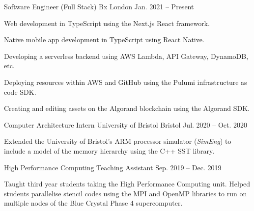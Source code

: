 \vspace{-1.1em}


\vspace{-0.2em}

\begin{cventries}

  \cventry
    {Software Engineer (Full Stack)} %
    {Bx} %
    {London} %
    {Jan. 2021 -- Present} %
    {
      \begin{cvitems} %
        \item {Web development in TypeScript using the Next.js React framework.}
        \item {Native mobile app development in TypeScript using React Native.}
        \item {Developing a serverless backend using AWS Lambda, API Gateway, DynamoDB, etc.}
        \item {Deploying resources within AWS and GitHub using the Pulumi infrastructure as code SDK.}
        \item {Creating and editing assets on the Algorand blockchain using the Algorand SDK.}
      \end{cvitems}
    }

  \cventry
    {Computer Architecture Intern} %
    {University of Bristol} %
    {Bristol} %
    {Jul. 2020 -- Oct. 2020} %
    {
      \begin{cvitems} %
        \item {Extended the University of Bristol's ARM processor simulator (\textit{SimEng}) to include a model of the memory hierarchy using the C++ SST library.}
      \end{cvitems}
    }

  \vspace{-0.2em}
  
  \cventry
    {High Performance Computing Teaching Assistant} %
    {} %
    {} %
    {Sep. 2019 -- Dec. 2019} %
    {
      \begin{cvitems} %
        \item {Taught third year students taking the High Performance Computing unit. Helped students parallelise stencil codes using the MPI and OpenMP libraries to run on multiple nodes of the Blue Crystal Phase 4 supercomputer.}
      \end{cvitems}
    }


\end{cventries}
